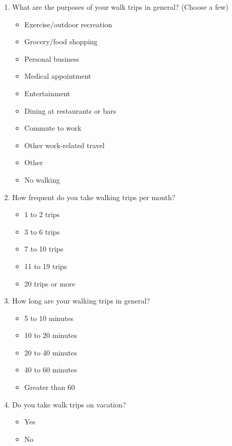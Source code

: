 \begin{enumerate}
    \setcounter{enumi}{\value{surveyCounter}}
    
    \item What are the purposes of your walk trips in general? (Choose a few)
    \begin{itemize}
        \item Exercise/outdoor recreation
        \item Grocery/food shopping
        \item Personal business
        \item Medical appointment
        \item Entertainment
        \item Dining at restaurants or bars
        \item Commute to work
        \item Other work-related travel
        \item Other
        \item No walking
    \end{itemize}
    
    \item How frequent do you take walking trips per month?
    \begin{itemize}
        \item 1 to 2 trips
        \item 3 to 6 trips
        \item 7 to 10 trips
        \item 11 to 19 trips
        \item 20 trips or more
    \end{itemize}
    
    \item How long are your walking trips in general?
    \begin{itemize}
        \item 5 to 10 minutes
        \item 10 to 20 minutes
        \item 20 to 40 minutes
        \item 40 to 60 minutes
        \item Greater than 60
    \end{itemize}
    
    \item Do you take walk trips on vacation?
    \begin{itemize}
        \item Yes
        \item No
    \end{itemize}
    
    \setcounter{surveyCounter}{\value{enumi}}
\end{enumerate}


